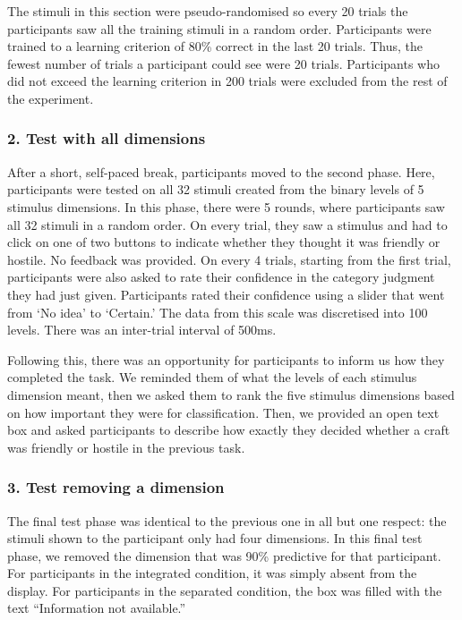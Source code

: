 \documentclass[doc, a4paper, apacite]{apa6}
\begin{document}
The stimuli in this section were pseudo-randomised so every 20 trials the participants saw all the training stimuli in a random order. 
Participants were trained to a learning criterion of 80\% correct in the last 20 trials. 
Thus, the fewest number of trials a participant could see were 20 trials. 
Participants who did not exceed the learning criterion in 200 trials were excluded from the rest of the experiment. 

\subsubsection{2. Test with all dimensions}
After a short, self-paced break, participants moved to the second phase. 
Here, participants were tested on all 32 stimuli created from the binary levels of 5 stimulus dimensions. 
In this phase, there were 5 rounds, where participants saw all 32 stimuli in a random order. 
On every trial, they saw a stimulus and had to click on one of two buttons to indicate whether they thought it was friendly or hostile. 
No feedback was provided. 
On every 4 trials, starting from the first trial, participants were also asked to rate their confidence in the category judgment they had just given. 
Participants rated their confidence using a slider that went from `No idea' to `Certain.'
The data from this scale was discretised into 100 levels. 
There was an inter-trial interval of 500ms. 

Following this, there was an opportunity for participants to inform us how they completed the task. 
We reminded them of what the levels of each stimulus dimension meant, then we asked them to rank the five stimulus dimensions based on how important they were for classification. 
Then, we provided an open text box and asked participants to describe how exactly they decided whether a craft was friendly or hostile in the previous task.

\subsubsection{3. Test removing a dimension}
The final test phase was identical to the previous one in all but one respect: the stimuli shown to the participant only had four dimensions. 
In this final test phase, we removed the dimension that was 90\% predictive for that participant. 
For participants in the integrated condition, it was simply absent from the display. 
For participants in the separated condition, the box was filled with the text ``Information not available.''
\end{document}
